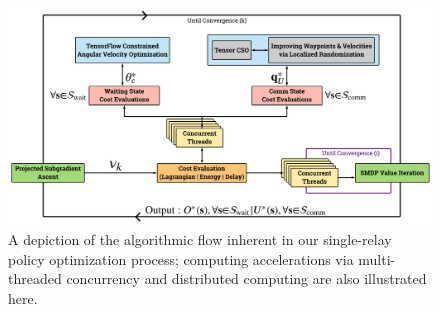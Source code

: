 \documentclass[12pt, draftcls, onecolumn]{IEEEtran}
\theoremstyle{plain}
\theoremstyle{definition}
\theoremstyle{remark}
\begin{document}
\begin{figure} [t]
    \centering
    \includegraphics[width=0.9\linewidth]{figs/System_Flow_Chart.png}
    \caption{A depiction of the algorithmic flow inherent in our single-relay policy optimization process; computing accelerations via multi-threaded concurrency and distributed computing are also illustrated here.}
    \vspace{-8mm}
    \label{F3}
\end{figure}
\end{document}
